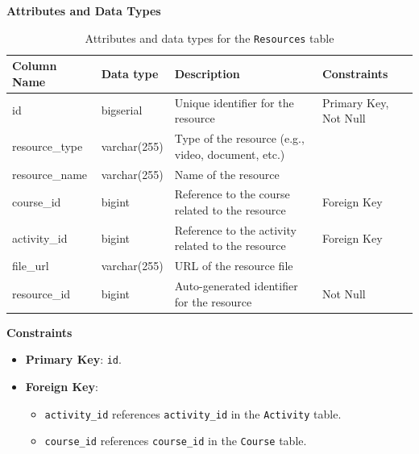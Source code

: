 \documentclass[12pt]{article}
\begin{document}
\textbf{Attributes and Data Types}
\begin{table}[H]
    \centering
    \renewcommand{\arraystretch}{1.5}
    \begin{tabular}{|l|l|p{4.5cm}|l|}
    \hline
    \rowcolor[HTML]{96FFFB} 
    \textbf{Column Name} & \textbf{Data type}        & \textbf{Description}                                   & \textbf{Constraints}             \\ \hline
    id                   & bigserial               & Unique identifier for the resource                     & Primary Key, Not Null            \\ \hline
    resource\_type       & varchar(255)            & Type of the resource (e.g., video, document, etc.)     &                                 \\ \hline
    resource\_name       & varchar(255)            & Name of the resource                                   &                                 \\ \hline
    course\_id           & bigint                  & Reference to the course related to the resource        & Foreign Key                      \\ \hline
    activity\_id         & bigint                  & Reference to the activity related to the resource      & Foreign Key                      \\ \hline
    file\_url            & varchar(255)            & URL of the resource file                               &                                 \\ \hline
    resource\_id         & bigint                  & Auto-generated identifier for the resource             & Not Null                         \\ \hline
    \end{tabular}
    \caption{Attributes and data types for the \texttt{Resources} table}
\end{table}

\noindent
\textbf{Constraints}
\begin{itemize}
    \item \textbf{Primary Key}: \texttt{id}.
    \item \textbf{Foreign Key}: 
    \begin{itemize}
        \item \texttt{activity\_id} references \texttt{activity\_id} in the \texttt{Activity} table.
        \item \texttt{course\_id} references \texttt{course\_id} in the \texttt{Course} table.
    \end{itemize}
\end{itemize}
\end{document}

